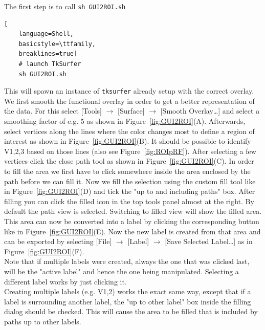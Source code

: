 \documentclass[12pt,a4paper]{scrartcl}
\begin{document}
\noindent The first step is to call \texttt{sh GUI2ROI.sh}
\begin{lstlisting}[
    language=Shell,
    basicstyle=\ttfamily,
    breaklines=true]
    # launch TkSurfer
    sh GUI2ROI.sh
\end{lstlisting}
This will spawn an instance of \texttt{tksurfer} already setup with the correct overlay.\\
\noindent We first smooth the functional overlay in order to get a better representation of the data. For this select [Tools] $\rightarrow$ [Surface] $\rightarrow$ [Smooth Overlay\dots] and select a smoothing factor of e.g. 5 as shown in Figure~\ref{fig:GUI2ROI}(A). Afterwards, select vertices along the lines where the color changes most to define a region of interest as shown in Figure~\ref{fig:GUI2ROI}(B). It should be possible to identify V1,2,3 based on those lines (also see Figure~\ref{fig:ROIpRF}). After selecting a few vertices click the close path tool as shown in Figure~\ref{fig:GUI2ROI}(C). In order to fill the area we first have to click somewhere inside the area enclosed by the path before we can fill it. Now we fill the selection using the custom fill tool like in Figure~\ref{fig:GUI2ROI}(D) and tick the "up to and including paths" box. After filling you can click the filled icon in the top tools panel almost at the right. By default the path view is selected. Switching to filled view will show the filled area. This area can now be converted into a label by clicking the corresponding button like in Figure~\ref{fig:GUI2ROI}(E). Now the new label is created from that area and can be exported by selecting [File] $\rightarrow$ [Label] $\rightarrow$ [Save Selected Label\dots] as in Figure~\ref{fig:GUI2ROI}(F).\\

\noindent Note that if multiple labels were created, always the one that was clicked last, will be the "active label" and hence the one being manipulated. Selecting a different label works by just clicking it.\\

\noindent Creating multiple labels (e.g. V1,2) works the exact same way, except that if a label is surrounding another label, the "up to other label" box inside the filling dialog should be checked. This will cause the area to be filled that is included by paths up to other labels.\\
\end{document}
